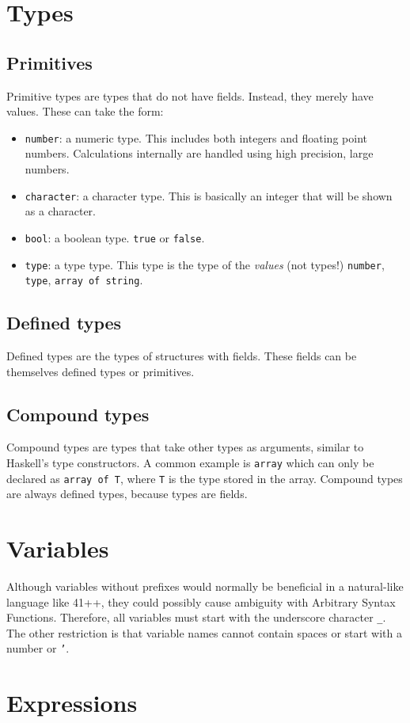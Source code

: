 \documentclass{article}
\newcommand{\code}[1]{\texttt{#1}}
\begin{document}
\section{Types}
\subsection{Primitives}
Primitive types are types that do not have fields. Instead, they merely have values. These can take the form:
\begin{itemize}
\item \code{number}: a numeric type. This includes both integers and floating point numbers. Calculations internally are handled using high precision, large numbers.
\item \code{character}: a character type. This is basically an integer that will be shown as a character.
\item \code{bool}: a boolean type. \code{true} or \code{false}.
\item \code{type}: a type type. This type is the type of the \emph{values} (not types!) \code{number}, \code{type}, \code{array of string}.
\end{itemize}
\subsection{Defined types}
Defined types are the types of structures with fields. These fields can be themselves defined types or primitives.
\subsection{Compound types}
Compound types are types that take other types as arguments, similar to Haskell's type constructors. A common example is \code{array} which can only be declared as \code{array of T}, where \code{T} is the type stored in the array. Compound types are always defined types, because types are fields.
\section{Variables}
Although variables without prefixes would normally be beneficial in a natural-like language like 41++, they could possibly cause ambiguity with Arbitrary Syntax Functions. Therefore, all variables must start with the underscore character \code{\_}. The other restriction is that variable names cannot contain spaces or start with a number or \code{'}. 
\section{Expressions}
\end{document}
